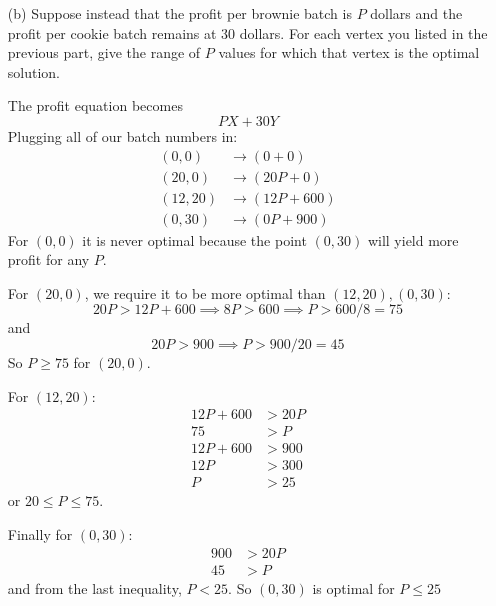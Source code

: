 \documentclass{article}
\begin{document}
\begin{itemize}
        \item [(b)] Suppose instead that the profit per brownie batch is $P$ dollars and the profit per cookie batch remains at $30$ dollars. For each vertex you listed in the previous part, give the range of $P$ values for which that vertex is the optimal solution.
            \begin{answer}
                The profit equation becomes
                    \begin{equation*}
                        PX + 30Y
                    \end{equation*}
                Plugging all of our batch numbers in:
                    \begin{align*}
                        (0, 0) &\rightarrow (0 + 0)      \\
                        (20, 0) &\rightarrow (20P + 0)    \\
                        (12, 20) &\rightarrow (12P + 600)  \\
                        (0, 30) &\rightarrow (0P + 900)     
                    \end{align*}
                For $(0, 0)$ it is never optimal because the point $(0, 30)$ will yield more profit for any $P$.

                For $(20, 0)$, we require it to be more optimal than $(12, 20), (0, 30)$:
                    \begin{equation*}
                        20P > 12P + 600 \implies 8P > 600 \implies P > 600 / 8 = 75
                    \end{equation*}
                and
                    \begin{equation*}
                        20P > 900 \implies P > 900 / 20 = 45
                    \end{equation*}
                So $P \geq 75$ for $(20, 0)$.

                For $(12, 20)$:
                    \begin{align*}
                        12P + 600 &> 20P \\
                        75        &> P   \\
                        12P + 600 &> 900 \\
                        12P       &> 300 \\
                        P         &> 25    
                    \end{align*}
                or $20 \leq P \leq 75$.

                Finally for $(0, 30)$:
                    \begin{align*}
                        900 &> 20P \\
                        45  &> P     
                    \end{align*}
                and from the last inequality, $P < 25$. So $(0, 30)$ is optimal for $P \leq 25$
            \end{answer}
    \end{itemize}
\end{document}
